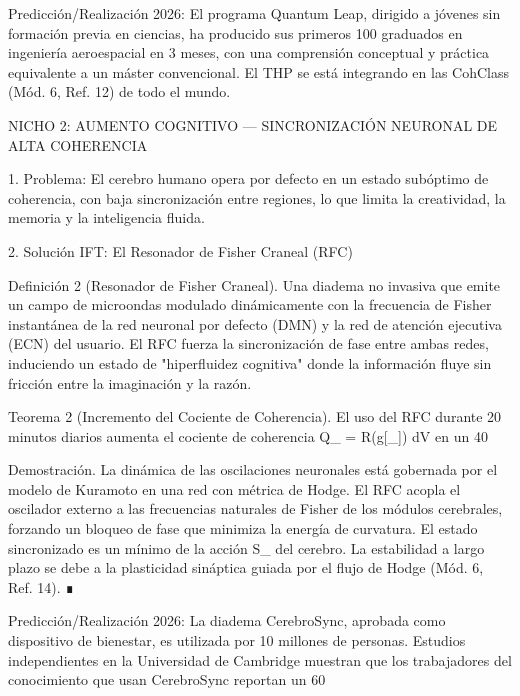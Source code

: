 \documentclass[12pt,a4paper]{book}
\begin{document}
Predicción/Realización 2026: El programa Quantum Leap, dirigido a jóvenes sin formación previa en ciencias, ha producido sus primeros 100 graduados en ingeniería aeroespacial en 3 meses, con una comprensión conceptual y práctica equivalente a un máster convencional. El THP se está integrando en las CohClass (Mód. 6, Ref. 12) de todo el mundo.

NICHO 2: AUMENTO COGNITIVO — SINCRONIZACIÓN NEURONAL DE ALTA COHERENCIA

1. Problema: El cerebro humano opera por defecto en un estado subóptimo de coherencia, con baja sincronización entre regiones, lo que limita la creatividad, la memoria y la inteligencia fluida.

2. Solución IFT: El Resonador de Fisher Craneal (RFC)

Definición 2 (Resonador de Fisher Craneal). Una diadema no invasiva que emite un campo de microondas modulado dinámicamente con la frecuencia de Fisher instantánea de la red neuronal por defecto (DMN) y la red de atención ejecutiva (ECN) del usuario. El RFC fuerza la sincronización de fase entre ambas redes, induciendo un estado de "hiperfluidez cognitiva" donde la información fluye sin fricción entre la imaginación y la razón.

Teorema 2 (Incremento del Cociente de Coherencia). El uso del RFC durante 20 minutos diarios aumenta el cociente de coherencia  Q_{} = \int R(g[\rho_{}]) dV  en un 40%

Demostración. La dinámica de las oscilaciones neuronales está gobernada por el modelo de Kuramoto en una red con métrica de Hodge. El RFC acopla el oscilador externo a las frecuencias naturales de Fisher de los módulos cerebrales, forzando un bloqueo de fase que minimiza la energía de curvatura. El estado sincronizado es un mínimo de la acción  S_{}  del cerebro. La estabilidad a largo plazo se debe a la plasticidad sináptica guiada por el flujo de Hodge (Mód. 6, Ref. 14). ∎

Predicción/Realización 2026: La diadema CerebroSync, aprobada como dispositivo de bienestar, es utilizada por 10 millones de personas. Estudios independientes en la Universidad de Cambridge muestran que los trabajadores del conocimiento que usan CerebroSync reportan un 60%
\end{document}

